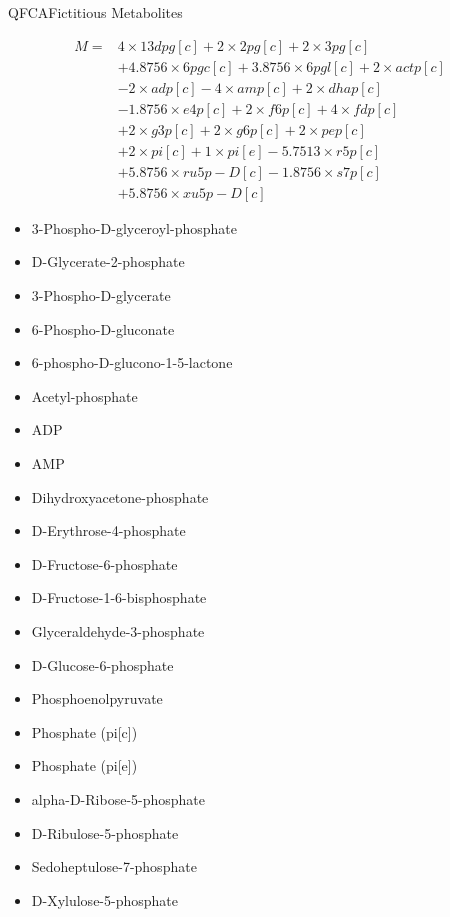\documentclass[10pt]{beamer}
\theoremstyle{remark}
\theoremstyle{definition}
\begin{document}
\begin{frame}{QFCA}{Fictitious Metabolites}
{\tiny
\[
\begin{split}
M = &4\times 13dpg[c] + 2\times 2pg[c] + 2\times 3pg[c]\\
	&+ 4.8756\times 6pgc[c] + 3.8756\times 6pgl[c] + 2\times actp[c]\\
	&- 2\times adp[c] - 4\times amp[c] + 2\times dhap[c]\\
	&- 1.8756\times e4p[c] + 2\times f6p[c] + 4\times fdp[c]\\
	&+ 2\times g3p[c] + 2\times g6p[c] + 2\times pep[c]\\
	&+ 2\times pi[c] + 1\times pi[e] - 5.7513 \times r5p[c]\\
	&+ 5.8756\times ru5p-D[c] - 1.8756\times s7p[c]\\
	&+ 5.8756\times xu5p-D[c]
\end{split}
\]
\pause
\begin{multicols}{2}
	\begin{itemize}
		\item 3-Phospho-D-glyceroyl-phosphate
		\item D-Glycerate-2-phosphate
		\item 3-Phospho-D-glycerate
		\item 6-Phospho-D-gluconate
		\item 6-phospho-D-glucono-1-5-lactone
		\item Acetyl-phosphate
		\item ADP
		\item AMP
		\item Dihydroxyacetone-phosphate
		\item D-Erythrose-4-phosphate
		\item D-Fructose-6-phosphate
		\item D-Fructose-1-6-bisphosphate
		\item Glyceraldehyde-3-phosphate
		\item D-Glucose-6-phosphate
		\item Phosphoenolpyruvate
		\item Phosphate (pi[c])
		\item Phosphate (pi[e])
		\item alpha-D-Ribose-5-phosphate
		\item D-Ribulose-5-phosphate
		\item Sedoheptulose-7-phosphate
		\item D-Xylulose-5-phosphate
	\end{itemize}
\end{multicols}
}
\end{frame}
\end{document}
